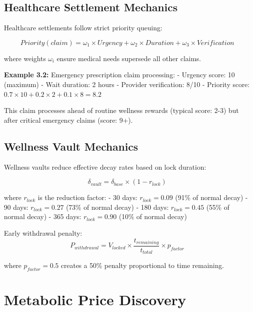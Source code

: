 \documentclass[11pt,letterpaper]{article}
\begin{document}
\subsection{Healthcare Settlement Mechanics}

Healthcare settlements follow strict priority queuing:

\begin{equation}
Priority(claim) = \omega_1 \times Urgency + \omega_2 \times Duration + \omega_3 \times Verification
\end{equation}

where weights $\omega_i$ ensure medical needs supersede all other claims.

\textbf{Example 3.2:} Emergency prescription claim processing:
- Urgency score: 10 (maximum)
- Wait duration: 2 hours
- Provider verification: 8/10
- Priority score: $0.7 \times 10 + 0.2 \times 2 + 0.1 \times 8 = 8.2$

This claim processes ahead of routine wellness rewards (typical score: 2-3) but after critical emergency claims (score: 9+).

\subsection{Wellness Vault Mechanics}

Wellness vaults reduce effective decay rates based on lock duration:

\begin{equation}
\delta_{vault} = \delta_{base} \times (1 - r_{lock})
\end{equation}

where $r_{lock}$ is the reduction factor:
- 30 days: $r_{lock} = 0.09$ (91\% of normal decay)
- 90 days: $r_{lock} = 0.27$ (73\% of normal decay)  
- 180 days: $r_{lock} = 0.45$ (55\% of normal decay)
- 365 days: $r_{lock} = 0.90$ (10\% of normal decay)

Early withdrawal penalty:
\begin{equation}
P_{withdrawal} = V_{locked} \times \frac{t_{remaining}}{t_{total}} \times p_{factor}
\end{equation}

where $p_{factor} = 0.5$ creates a 50\% penalty proportional to time remaining.

\section{Metabolic Price Discovery}
\end{document}
